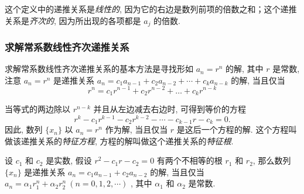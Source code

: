 这个定义中的递推关系是\textit{线性的}, 因为它的右边是数列前项的倍数之和；这个递推关系是\textit{齐次的}, 
因为所出现的各项都是 $a_j$ 的倍数.

\subsubsection{求解常系数线性齐次递推关系}

求解常系数线性齐次递推关系的基本方法是寻找形如 $a_n=r^n$ 的解, 
其中 $r$ 是常数, 注意 $a_n=r^n$ 是递推关系 $a_n=c_{1}a_{n-1}+c_{2}a_{n-2}+\cdots +c_{k}a_{n-k}$ 的解, 
当且仅当 $$r^{n}=c_{1}r^{n-1}+c_{2}r^{n-2}+\ldots +c_{k}r^{n-k}$$

当等式的两边除以 $r^{n-k}$ 并且从左边减去右边时, 可得到等价的方程
$$r^{k}-c_{1}r^{k-1}-c_{2}r^{k-2}-\cdots -c_{k-1}r-c_{k}=0.$$
因此, 数列 $\{x_n\}$ 以 $a_n=r^n$ 作为解, 当且仅当 $r$ 是这后一个方程的解.
这个方程叫做该递推关系的\textit{特征方程}, 方程的解叫做这个递推关系的\textit{特征根}.

\begin{theorem}[常系数线性齐次递推定理]
    设 $c_1$ 和 $c_2$ 是实数, 假设 $r^2-c_1r-c_2=0$ 有两个不相等的根 $r_1$ 和 $r_2$, 那么数列 $\{x_n\}$ 是递推关系 $a_n=c_1a_{n-1}+c_2a_{n-2}$ 的解, 
    当且仅当 $a_n=\alpha_1 r_1^n+\alpha_2 r_2^n~  (n=0,1,2,\cdots)$ , 其中 $\alpha_1$ 和 $\alpha_2$ 是常数.
\end{theorem}

